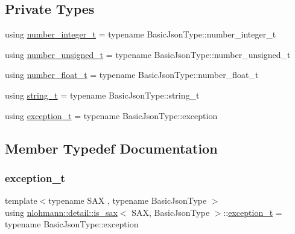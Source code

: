 \subsection*{Private Types}
\begin{DoxyCompactItemize}
\item 
using \hyperlink{structnlohmann_1_1detail_1_1is__sax_aa9a29390ca9810cee149510f586f5573}{number\+\_\+integer\+\_\+t} = typename Basic\+Json\+Type\+::number\+\_\+integer\+\_\+t
\item 
using \hyperlink{structnlohmann_1_1detail_1_1is__sax_a655c9b8038e51e5b9211e2419118644d}{number\+\_\+unsigned\+\_\+t} = typename Basic\+Json\+Type\+::number\+\_\+unsigned\+\_\+t
\item 
using \hyperlink{structnlohmann_1_1detail_1_1is__sax_a58d3205c8d3c7a01cc330374fa7976c5}{number\+\_\+float\+\_\+t} = typename Basic\+Json\+Type\+::number\+\_\+float\+\_\+t
\item 
using \hyperlink{structnlohmann_1_1detail_1_1is__sax_ad8e2e1427ff43536370b6db6ab83ae50}{string\+\_\+t} = typename Basic\+Json\+Type\+::string\+\_\+t
\item 
using \hyperlink{structnlohmann_1_1detail_1_1is__sax_a6efa516f35d544cc8ce9a954f849fed1}{exception\+\_\+t} = typename Basic\+Json\+Type\+::exception
\end{DoxyCompactItemize}


\subsection{Member Typedef Documentation}
\mbox{\label{structnlohmann_1_1detail_1_1is__sax_a6efa516f35d544cc8ce9a954f849fed1}} 
\subsubsection{\texorpdfstring{exception\+\_\+t}{exception\_t}}
{\footnotesize\ttfamily template$<$typename S\+AX , typename Basic\+Json\+Type $>$ \\
using \hyperlink{structnlohmann_1_1detail_1_1is__sax}{nlohmann\+::detail\+::is\+\_\+sax}$<$ S\+AX, Basic\+Json\+Type $>$\+::\hyperlink{structnlohmann_1_1detail_1_1is__sax_a6efa516f35d544cc8ce9a954f849fed1}{exception\+\_\+t} =  typename Basic\+Json\+Type\+::exception\hspace{0.3cm}{\ttfamily [private]}}

